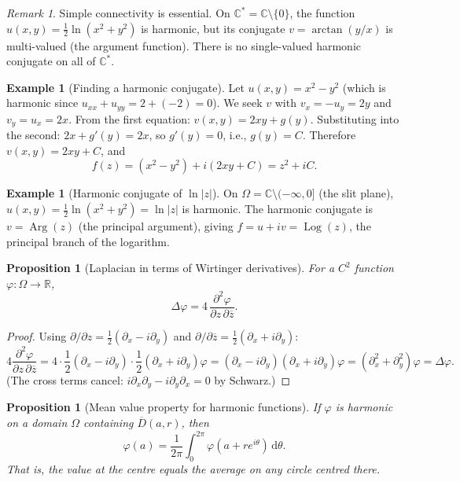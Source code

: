 \documentclass[12pt,a4paper,openany]{book}
\theoremstyle{definition}
\newtheorem{example}[definition]{Example}
\theoremstyle{plain}
\newtheorem{proposition}[definition]{Proposition}
\theoremstyle{remark}
\newtheorem{remark}[definition]{Remark}
\newcommand{\C}{\mathbb{C}}
\newcommand{\R}{\mathbb{R}}
\DeclareMathOperator{\Arg}{Arg}
\DeclareMathOperator{\Log}{Log}
\newcommand{\dd}{\mathrm{d}}
\newcommand{\abs}[1]{\left|#1\right|}
\newcommand{\conj}[1]{\overline{#1}}
\begin{document}
\begin{remark}
Simple connectivity is essential. On $\C^* = \C\setminus\{0\}$, the function $u(x,y)=\frac{1}{2}\ln(x^2+y^2)$ is harmonic, but its conjugate $v = \arctan(y/x)$ is multi-valued (the argument function). There is no single-valued harmonic conjugate on all of $\C^*$.
\end{remark}

\begin{example}[Finding a harmonic conjugate]
\label{ex:harmonic-conjugate}
Let $u(x,y) = x^2-y^2$ (which is harmonic since $u_{xx}+u_{yy}=2+(-2)=0$). We seek $v$ with $v_x = -u_y = 2y$ and $v_y = u_x = 2x$. From the first equation: $v(x,y) = 2xy + g(y)$. Substituting into the second: $2x + g'(y) = 2x$, so $g'(y)=0$, i.e., $g(y)=C$. Therefore $v(x,y)=2xy+C$, and
\[
  f(z) = (x^2-y^2)+i(2xy+C) = z^2+iC.
\]
\end{example}

\begin{example}[Harmonic conjugate of $\ln\abs{z}$]
\label{ex:harmonic-ln}
On $\Omega = \C\setminus(-\infty,0]$ (the slit plane), $u(x,y) = \frac{1}{2}\ln(x^2+y^2) = \ln\abs{z}$ is harmonic. The harmonic conjugate is $v = \Arg(z)$ (the principal argument), giving $f = u+iv = \Log(z)$, the principal branch of the logarithm.
\end{example}

\begin{proposition}[Laplacian in terms of Wirtinger derivatives]
\label{prop:laplacian-wirtinger}
For a $C^2$ function $\varphi:\Omega\to\R$,
\[
  \Delta\varphi = 4\,\frac{\partial^2\varphi}{\partial z\,\partial\conj{z}}.
\]
\end{proposition}

\begin{proof}
Using $\partial/\partial z = \frac{1}{2}(\partial_x - i\partial_y)$ and $\partial/\partial\conj{z} = \frac{1}{2}(\partial_x+i\partial_y)$:
\[
  4\frac{\partial^2\varphi}{\partial z\,\partial\conj{z}} = 4\cdot\frac{1}{2}(\partial_x-i\partial_y)\cdot\frac{1}{2}(\partial_x+i\partial_y)\varphi = (\partial_x-i\partial_y)(\partial_x+i\partial_y)\varphi = (\partial_x^2+\partial_y^2)\varphi = \Delta\varphi.
\]
(The cross terms cancel: $i\partial_x\partial_y - i\partial_y\partial_x = 0$ by Schwarz.)
\end{proof}

\begin{proposition}[Mean value property for harmonic functions]
\label{prop:mean-value-harmonic}
If $\varphi$ is harmonic on a domain $\Omega$ containing $\conj{D}(a,r)$, then
\[
  \varphi(a) = \frac{1}{2\pi}\int_0^{2\pi}\varphi(a+re^{i\theta})\,\dd\theta.
\]
That is, the value at the centre equals the average on any circle centred there.
\end{proposition}
\end{document}
